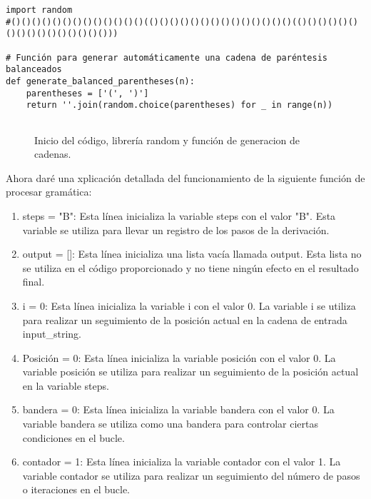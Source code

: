 \begin{enumerate}
\begin{lstlisting}
import random
#()()()()()()()()()()()()()(()()()()()()()()()()()()()()(()()()()()()()()()()()()()()()()))

# Función para generar automáticamente una cadena de paréntesis balanceados
def generate_balanced_parentheses(n):
    parentheses = ['(', ')']
    return ''.join(random.choice(parentheses) for _ in range(n))
    
\end{lstlisting}
\begin{figure}[h]
\begin{center}
\end{center}
\caption{Inicio del código, librería random y función de generacion de cadenas.}
\label{fig:imagen}
\end{figure}

Ahora daré una xplicación detallada del funcionamiento de la siguiente función de procesar gramática:\newline
\begin{enumerate}
    \item steps = "B": Esta línea inicializa la variable steps con el valor "B". Esta variable se utiliza para llevar un registro de los pasos de la derivación.\newline

    \item output = []: Esta línea inicializa una lista vacía llamada output. Esta lista no se utiliza en el código proporcionado y no tiene ningún efecto en el resultado final.\newline
    
    \item i = 0: Esta línea inicializa la variable i con el valor 0. La variable i se utiliza para realizar un seguimiento de la posición actual en la cadena de entrada input\_string.\newline
    
    \item Posición = 0: Esta línea inicializa la variable posición con el valor 0. La variable posición se utiliza para realizar un seguimiento de la posición actual en la variable steps.\newline
    
    \item bandera = 0: Esta línea inicializa la variable bandera con el valor 0. La variable bandera se utiliza como una bandera para controlar ciertas condiciones en el bucle.\newline
    
    \item contador = 1: Esta línea inicializa la variable contador con el valor 1. La variable contador se utiliza para realizar un seguimiento del número de pasos o iteraciones en el bucle.\newline
    

\end{enumerate}
\end{enumerate}
